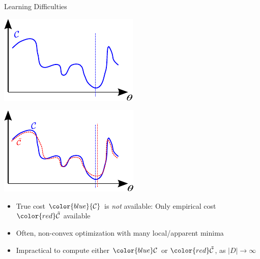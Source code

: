 \documentclass{beamer}
\newcommand{\CC}[0]{\mathcal{C}}
\begin{document}
\begin{frame}{Learning Difficulties}

    \centering
    \begin{minipage}{0.48\textwidth}
    \centering
    \includegraphics[width=\columnwidth]{cost_true.pdf}
    \end{minipage}
    \hfill
    \begin{minipage}{0.48\textwidth}
    \centering
    \includegraphics[width=\columnwidth]{cost_both.pdf}
    \end{minipage}

    \vspace{2mm}
    \begin{itemize}
    \item True cost $\color{blue}{\CC}$ is \emph{not} available: Only empirical cost $\color{red}\tilde{\CC}$ available
    \item Often, non-convex optimization with many local/apparent minima
    \item Impractical to compute either $\color{blue}\CC$ or $\color{red}\tilde{\CC}$, as $\left| D \right|\to\infty$
    \end{itemize}

\end{frame}
\end{document}
